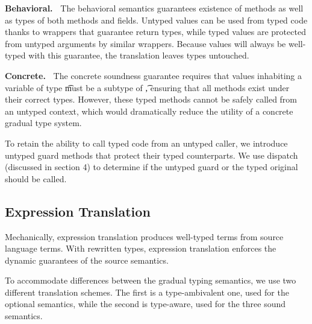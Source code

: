 \documentclass[USenglish]{tex/lipics-v2016}
\begin{document}
{\bf Behavioral.~} The behavioral semantics guarantees existence of methods as
well as types of both methods and fields. Untyped values can be used from
typed code thanks to wrappers that guarantee return types, while typed values
are protected from untyped arguments by similar wrappers. Because values will
always be well-typed with this guarantee, the translation leaves types
untouched.

{\bf Concrete.~} The concrete soundness guarantee requires that values
inhabiting a variable of type \t must be a subtype of \t, ensuring that all
methods exist under their correct types. However, these typed methods cannot
be safely called from an untyped context, which would dramatically reduce the
utility of a concrete gradual type system.

To retain the ability to call typed code from an untyped caller, we introduce
untyped guard methods that protect their typed counterparts. We use dispatch
(discussed in section 4) to determine if the untyped guard or the typed
original should be called.

\subsection{Expression Translation} Mechanically, expression translation
produces well-typed \kafka terms from source language terms. With rewritten
types, expression translation enforces the dynamic guarantees of the source
semantics.

To accommodate differences between the gradual typing semantics, we use  two
different translation schemes. The first is a type-ambivalent one, used for
the optional semantics, while the second is type-aware, used for the three
sound semantics.
\end{document}
